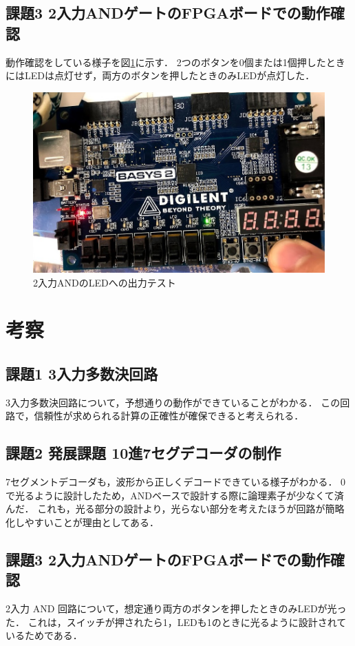 \subsection{課題3 2入力ANDゲートのFPGAボードでの動作確認}
動作確認をしている様子を図\ref{fig:LEDANDex}に示す．
2つのボタンを0個または1個押したときにはLEDは点灯せず，両方のボタンを押したときのみLEDが点灯した．

\begin{figure}[tbp]
  \includegraphics[angle=90,width=140mm]{week2/pics/LEDAND.jpg}
  \centering
   \caption{2入力ANDのLEDへの出力テスト} %
   \label{fig:LEDANDex} %
\end{figure}

\section{考察}
\subsection{課題1 3入力多数決回路}
3入力多数決回路について，予想通りの動作ができていることがわかる．
この回路で，信頼性が求められる計算の正確性が確保できると考えられる．

\subsection{課題2 発展課題 10進7セグデコーダの制作}
7セグメントデコーダも，波形から正しくデコードできている様子がわかる．
0 で光るように設計したため，ANDベースで設計する際に論理素子が少なくて済んだ．
これも，光る部分の設計より，光らない部分を考えたほうが回路が簡略化しやすいことが理由としてある．

\subsection{課題3 2入力ANDゲートのFPGAボードでの動作確認}
2入力 AND 回路について，想定通り両方のボタンを押したときのみLEDが光った．
これは，スイッチが押されたら1，LEDも1のときに光るように設計されているためである．

